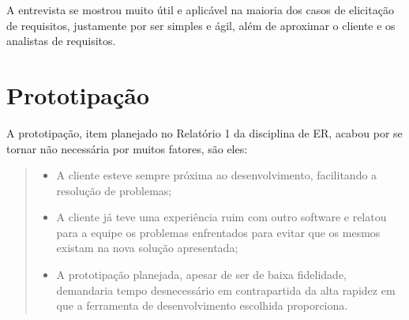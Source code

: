 A entrevista se mostrou muito útil e aplicável na maioria dos casos de elicitação de requisitos, justamente por ser simples e ágil, além de aproximar o cliente e os analistas de requisitos.

\section[Prototipação]{Prototipação}
A prototipação, item planejado no  Relatório 1 da disciplina de ER, acabou por se tornar não necessária por muitos fatores, são eles:
\begin{quote} 
	\begin{itemize}
        \item A cliente esteve sempre próxima ao desenvolvimento, facilitando a resolução de problemas;
		\item A cliente já teve uma experiência ruim com outro software e relatou para a equipe os problemas enfrentados para evitar que os mesmos existam na nova solução apresentada;
		\item A prototipação planejada, apesar de ser de baixa fidelidade, demandaria tempo desnecessário em contrapartida da alta rapidez em que a ferramenta de desenvolvimento escolhida proporciona.
    \end{itemize}
\end{quote}